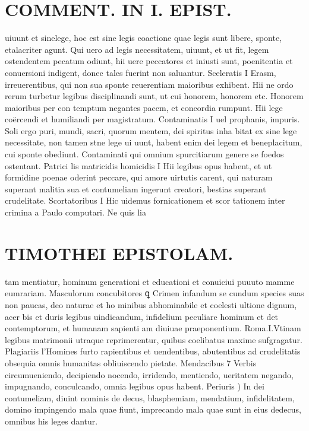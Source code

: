 \documentclass{article}
\begin{document}
\begin{pages}
\section*{COMMENT. IN I. EPIST. }
\marginpar{[ p.20 ]}\pstart uiuunt et sinelege, hoc est sine legis coactione quae legis sunt libere, sponte, etalacriter agunt. Qui uero ad legis necessitatem, uiuunt, et ut fit, legem ostendentem pecatum odiunt, hii uere peccatores et iniusti sunt, poenitentia et conuersioni indigent, donec tales fuerint non saluantur.  \pend\pstart Sceleratis I Erasm, irreuerentibus, qui non sua sponte reuerentiam maioribus exhibent. Hii ne ordo rerum turbetur legibus disciplinandi sunt, ut cui honorem, honorem etc. Honorem maioribus per con temptum negantes pacem, et concordia rumpunt. Hii lege coërcendi et humiliandi per magistratum.  \pend\pstart Contaminatis I uel prophanis, impuris. Soli ergo puri, mundi, sacri, quorum mentem, dei spiritus inha bitat ex sine lege necessitate, non tamen stne lege ui uunt, habent enim dei legem et beneplacitum, cui sponte obediunt. Contaminati qui omnium spurcitiarum genere se foedos ostentant.  \pend\pstart Patrici lis matricidis homicidis I Hii legibus opus habent, et ut formidine poenae oderint peccare, qui amore uirtutis carent, qui naturam superant malitia sua et contumeliam ingerunt creatori, bestias superant crudelitate.  \pend\pstart Scortatoribus I Hic uidemus fornicationem et scor tationem inter crimina a Paulo computari. Ne quis lia  \pend
\section*{TIMOTHEI EPISTOLAM. }
\marginpar{[ p.21 ]}\pstart tam mentiatur, hominum generationi et educationi et conuiciui puuuto mamme eumrariam.  \pend\pstart Masculorum concubitores ꝗ Crimen infandum se cundum species suas non paucas, deo naturae et ho minibus abhominabile et coelesti ultione dignum, acer bis et duris legibus uindicandum, infidelium peculiare hominum et det contemptorum, et humanam sapienti am diuiuae praeponentium. Roma.I.Vtinam legibus matrimonii utraque reprimerentur, quibus coelibatus maxime sufgragatur.  \pend\pstart Plagiariis l’Homines furto rapientibus et uendentibus, abutentibus ad crudelitatis obsequia omnis humanitas obliuiscendo pietate.  \pend\pstart Mendacibus 7 Verbis circumueniendo, decipiendo nocendo, irridendo, mentiendo, ueritatem negando, impugnando, conculcando, omnia legibus opus habent. Periuris ) In dei contumeliam, diuint nominis de decus, blasphemiam, mendatium, infidelitatem, domino impingendo mala quae fiunt, imprecando mala quae sunt in eius dedecus, omnibus his leges dantur.  \pend
{}
{}

\end{pages}
\end{document}

